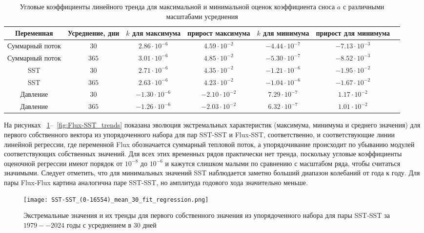 \begin{table}
	\centering
	\begin{tabular}{|c|c|c|c|c|c|c|}
		\hline
		Переменная & Усреднение, дни & $k$ для максимума & прирост максимума & $k$ для минимума & прирост для минимума\\
		\hline
		Суммарный поток & $30$ & $2.86 \cdot 10^{-6}$ & $4.59 \cdot 10^{-2}$ & $-4.44 \cdot 10^{-7}$ & $-7.13 \cdot 10^{-3}$ \\
		Суммарный поток & $365$ & $3.01 \cdot 10^{-6}$ & $4.85 \cdot 10^{-2}$ & $-5.30 \cdot 10^{-7}$ & $-8.52 \cdot 10^{-3}$    \\
		SST & $30$ & $2.71 \cdot 10^{-6}$ & $4.35 \cdot 10^{-2}$ & $-1.21 \cdot 10^{-6}$ & $-1.95 \cdot 10^{-2}$   \\
		SST & $365$ & $2.63 \cdot 10^{-6}$ & $4.23 \cdot 10^{-2}$ & $-1.04 \cdot 10^{-6}$ & $-1.67 \cdot 10^{-2}$    \\
		Давление & $30$ & $-1.30 \cdot 10^{-6}$ & $-2.10 \cdot 10^{-2}$ & $7.29 \cdot 10^{-7}$ & $1.17 \cdot 10^{-2}$ \\
		Давление & $365$ & $-1.26 \cdot 10^{-6}$ & $-2.03 \cdot 10^{-2}$ & $6.32 \cdot 10^{-7}$ & $1.01 \cdot 10^{-2}$ \\
		\hline
	\end{tabular}
	\caption{Угловые коэффициенты линейного тренда для максимальной и минимальной оценок коэффициента сноса $a$ с различными масштабами усреднения}
	\label{tab:angular_3d}
\end{table}


На рисунках ~\ref{fig:SST-SST_trends}--~\ref{fig:Flux-SST_trends} показана эволюция экстремальных характеристик (максимума, минимума и среднего значения) для первого собственного вектора из упорядоченного набора для пар SST-SST и Flux-SST, соответственно, и соответствующие линии линейной регрессии, где переменной Flux обозначается суммарный тепловой поток, а упорядочивание происходит по убыванию модулей соответствующих собственных значений. Для всех этих временных рядов практически нет тренда, поскольку угловые коэффициенты оценочной регрессии имеют порядок от $10^{-8}$ до $10^{-6}$ и кажутся слишком малыми по сравнению с масштабом ряда, чтобы считаться значимыми. Следует отметить, что для минимальных значений SST наблюдается заметно больший диапазон колебаний от года к году. Для пары Flux-Flux картина аналогична паре SST-SST, но амплитуда годового хода значительно меньше.

\begin{figure}
	\centering
	\texttt{[image: SST-SST\_(0-16554)\_mean\_30\_fit\_regression.png]}
	\caption{Экстремальные значения и их тренды для первого собственного значения из упорядоченного набора для пары SST-SST за $1979--2024$ годы с усреднением в $30$ дней}
	\label{fig:SST-SST_trends}
\end{figure}

